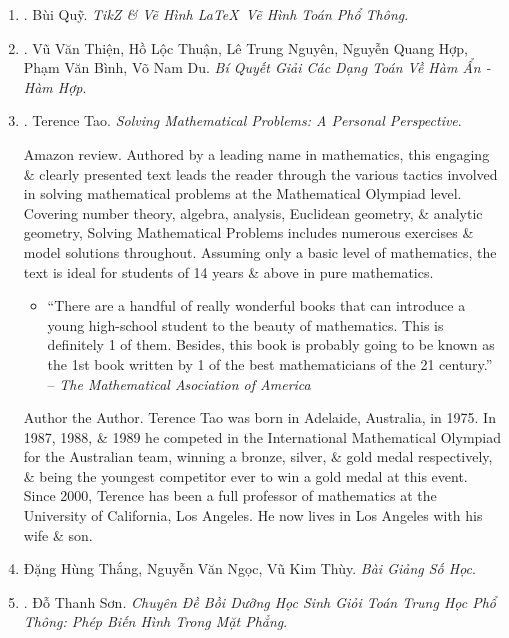 \documentclass{article}
\begin{document}
\begin{enumerate}
	\item \cite{Quy_TikZ}. {\sc Bùi Quỹ}. {\it TikZ \& Vẽ Hình \LaTeX\ Vẽ Hình Toán Phổ Thông}.\hfill{\sf[reading]}

	\item \cite{Thien_Thuan_Nguyen_Hop_Binh_Du_function}. {\sc Vũ Văn Thiện, Hồ Lộc Thuận, Lê Trung Nguyên, Nguyễn Quang Hợp, Phạm Văn Bình, Võ Nam Du}. {\it Bí Quyết Giải Các Dạng Toán Về Hàm Ẩn - Hàm Hợp}.\hfill{\sf[reading]}

	\item \cite{Tao2006}. {\sc Terence Tao}. {\it Solving Mathematical Problems: A Personal Perspective}. {}

	{\sf Amazon review.} Authored by a leading name in mathematics, this engaging \& clearly presented text leads the reader through the various tactics involved in solving mathematical problems at the Mathematical Olympiad level. Covering number theory, algebra, analysis, Euclidean geometry, \& analytic geometry, Solving Mathematical Problems includes numerous exercises \& model solutions throughout. Assuming only a basic level of mathematics, the text is ideal for students of 14 years \& above in pure mathematics.
	\begin{itemize}
		\item ``There are a handful of really wonderful books that can introduce a young high-school student to the beauty of mathematics. This is definitely 1 of them. Besides, this book is probably going to be known as the 1st book written by 1 of the best mathematicians of the 21 century.'' -- {\it The Mathematical Asociation of America}
	\end{itemize}
	{\sf Author the Author.} {\sc Terence Tao} was born in Adelaide, Australia, in 1975. In 1987, 1988, \& 1989 he competed in the International Mathematical Olympiad for the Australian team, winning a bronze, silver, \& gold medal respectively, \& being the youngest competitor ever to win a gold medal at this event. Since 2000, Terence has been a full professor of mathematics at the University of California, Los Angeles. He now lives in Los Angeles with his wife \& son.

	\item {\sc Đặng Hùng Thắng, Nguyễn Văn Ngọc, Vũ Kim Thùy}. {\it Bài Giảng Số Học}.

	\item \cite{Son2006}. {\sc Đỗ Thanh Sơn}. {\it Chuyên Đề Bồi Dưỡng Học Sinh Giỏi Toán Trung Học Phổ Thông: Phép Biến Hình Trong Mặt Phẳng}.\hfill{\sf[reading]}
\end{enumerate}
\end{document}
